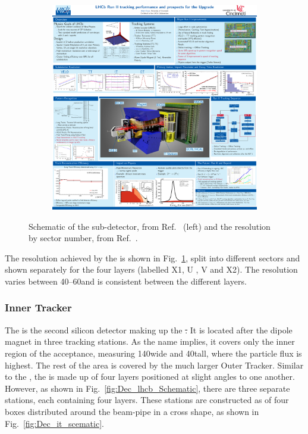 \begin{figure}[!h]
\begin{subfigure}[m]{0.49\textwidth}
        \includegraphics[width=1.0\textwidth]{figs/Detector/tt_resolution.pdf}
    \end{subfigure}
    \caption{Schematic of the \ttracker sub-detector, from Ref.~\cite{Alves:2008zz} (left) and the \ttracker resolution by sector number, from Ref.~\cite{LHCb-DP-2014-002}.}
    \label{fig:Dec_tt_scematic}   
\end{figure}


The resolution achieved by the \ttracker is shown in Fig.~\ref{fig:Dec_tt_scematic}, split into different sectors and shown separately for the four layers (labelled X1, U , V and X2). The resolution varies between 40--60\mum and is consistent between the different layers. 


\subsubsection{Inner Tracker}

The \intr is the second silicon detector making up the \st. It is located after the dipole magnet in three tracking stations. As the name implies, it covers only the inner region of the acceptance, measuring 140\cm wide and 40\cm tall, where the particle flux is highest. The rest of the area is covered by the much larger Outer Tracker. Similar to the \ttracker, the \intr is made up of four layers positioned at slight angles to one another. However, as shown in Fig.~\ref{fig:Dec_lhcb_Schematic}, there are three separate \intr stations, each containing four layers.
These stations are constructed as of four boxes distributed around the beam-pipe in a cross shape, as shown in Fig.~\ref{fig:Dec_it_scematic}. 



